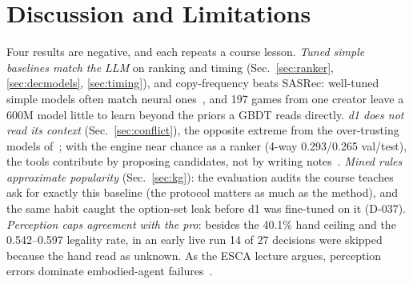 \section{Discussion and Limitations}
\label{sec:disc}

Four results are negative, and each repeats a course lesson. \emph{Tuned simple baselines match the LLM} on ranking and timing (Sec.~\ref{sec:ranker}, \ref{sec:decmodels}, \ref{sec:timing}), and copy-frequency beats SASRec: well-tuned simple models often match neural ones~\cite{rendle2020ncfvsmf,lim2026l13}, and 197 games from one creator leave a 600M model little to learn beyond the priors a GBDT reads directly. %
\emph{d1 does not read its context} (Sec.~\ref{sec:conflict}), the opposite extreme from the over-trusting models of~\cite{wu2024clasheval,ru2024ragchecker}; with the engine near chance as a ranker (4-way 0.293/0.265 val/test), the tools contribute by proposing candidates, not by writing notes~\cite{lim2026l13}. %
\emph{Mined rules approximate popularity} (Sec.~\ref{sec:kg}): the evaluation audits the course teaches~\cite{ruffinelli2020olddog,sun2020reevaluation} ask for exactly this baseline (the protocol matters as much as the method), and the same habit caught the option-set leak before d1 was fine-tuned on it (D-037). %
\emph{Perception caps agreement with the pro}: besides the 40.1\% hand ceiling and the 0.542--0.597 legality rate, in an early live run 14 of 27 decisions were skipped because the hand read as unknown. As the ESCA lecture argues, perception errors dominate embodied-agent failures~\cite{huang2025esca,cap6938L06C}. %


